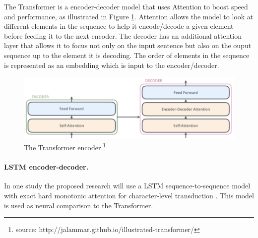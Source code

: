
The Transformer is a encoder-decoder model that uses Attention to boost speed and performance, as illustrated in Figure \ref{fig:transformer}. Attention allows the model to look at different elements in the sequence to help it encode/decode a given element before feeding it to the next encoder. The decoder has an additional attention layer that allows it to focus not only on the input sentence but also on the ouput sequence up to the element it is decoding. The order of elements in the sequence is represented as an embedding which is input to the encoder/decoder. 

\begin{figure}
    \centering
    \includegraphics[width=14cm]{figs/Transformer_simplified.png}
    \caption[Transformer]{The Transformer encoder.\footnote{source: http://jalammar.github.io/illustrated-transformer/}}
    \label{fig:transformer}
\end{figure}

\paragraph{LSTM encoder-decoder.} In one study the proposed research will use a LSTM sequence-to-sequence model with exact hard monotonic attention for character-level transduction \citep{wu-cotterell-2019-exact}. This model is used as neural comparison to the Transformer. 

